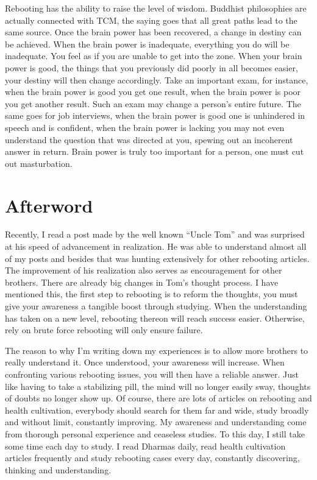 \documentclass[
]{book}
\begin{document}
Rebooting has the ability to raise the level of wisdom. Buddhist philosophies are actually connected with TCM, the saying goes that all great paths lead to the same source. Once the brain power has been recovered, a change in destiny can be achieved. When the brain power is inadequate, everything you do will be inadequate. You feel as if you are unable to get into the zone. When your brain power is good, the things that you previously did poorly in all becomes easier, your destiny will then change accordingly. Take an important exam, for instance, when the brain power is good you get one result, when the brain power is poor you get another result. Such an exam may change a person's entire future. The same goes for job interviews, when the brain power is good one is unhindered in speech and is confident, when the brain power is lacking you may not even understand the question that was directed at you, spewing out an incoherent answer in return. Brain power is truly too important for a person, one must cut out masturbation.

\hypertarget{afterword-5}{%
\section{Afterword}\label{afterword-5}}

Recently, I read a post made by the well known ``Uncle Tom'' and was surprised at his speed of advancement in realization. He was able to understand almost all of my posts and besides that was hunting extensively for other rebooting articles. The improvement of his realization also serves as encouragement for other brothers. There are already big changes in Tom's thought process. I have mentioned this, the first step to rebooting is to reform the thoughts, you must give your awareness a tangible boost through studying. When the understanding has taken on a new level, rebooting thereon will reach success easier. Otherwise, rely on brute force rebooting will only ensure failure.

The reason to why I'm writing down my experiences is to allow more brothers to really understand it. Once understood, your awareness will increase. When confronting various rebooting issues, you will then have a reliable answer. Just like having to take a stabilizing pill, the mind will no longer easily sway, thoughts of doubts no longer show up. Of course, there are lots of articles on rebooting and health cultivation, everybody should search for them far and wide, study broadly and without limit, constantly improving. My awareness and understanding come from thorough personal experience and ceaseless studies. To this day, I still take some time each day to study. I read Dharmas daily, read health cultivation articles frequently and study rebooting cases every day, constantly discovering, thinking and understanding.
\end{document}
